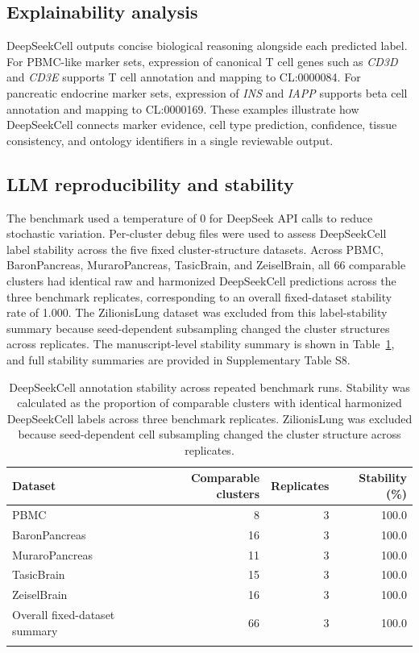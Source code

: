\documentclass[referee,lineno,pdflatex]{sn-jnl}
\begin{document}
\subsection{Explainability analysis}

DeepSeekCell outputs concise biological reasoning alongside each predicted label. For PBMC-like marker sets, expression of canonical T cell genes such as \textit{CD3D} and \textit{CD3E} supports T cell annotation and mapping to CL:0000084. For pancreatic endocrine marker sets, expression of \textit{INS} and \textit{IAPP} supports beta cell annotation and mapping to CL:0000169. These examples illustrate how DeepSeekCell connects marker evidence, cell type prediction, confidence, tissue consistency, and ontology identifiers in a single reviewable output.

\subsection{LLM reproducibility and stability}

The benchmark used a temperature of 0 for DeepSeek API calls to reduce stochastic variation. Per-cluster debug files were used to assess DeepSeekCell label stability across the five fixed cluster-structure datasets. Across PBMC, BaronPancreas, MuraroPancreas, TasicBrain, and ZeiselBrain, all 66 comparable clusters had identical raw and harmonized DeepSeekCell predictions across the three benchmark replicates, corresponding to an overall fixed-dataset stability rate of 1.000. The ZilionisLung dataset was excluded from this label-stability summary because seed-dependent subsampling changed the cluster structures across replicates. The manuscript-level stability summary is shown in Table~\ref{tab:stability}, and full stability summaries are provided in Supplementary Table S8.

\begin{table}[htp]
\caption{DeepSeekCell annotation stability across repeated benchmark runs. Stability was calculated as the proportion of comparable clusters with identical harmonized DeepSeekCell labels across three benchmark replicates. ZilionisLung was excluded because seed-dependent cell subsampling changed the cluster structure across replicates.}\label{tab:stability}
\begin{tabular}{@{}lrrr@{}}
\toprule
Dataset & Comparable clusters & Replicates & Stability (\%)\\
\midrule
PBMC & 8 & 3 & 100.0\\
BaronPancreas & 16 & 3 & 100.0\\
MuraroPancreas & 11 & 3 & 100.0\\
TasicBrain & 15 & 3 & 100.0\\
ZeiselBrain & 16 & 3 & 100.0\\
Overall fixed-dataset summary & 66 & 3 & 100.0\\
\botrule
\end{tabular}
\end{table}
\end{document}
